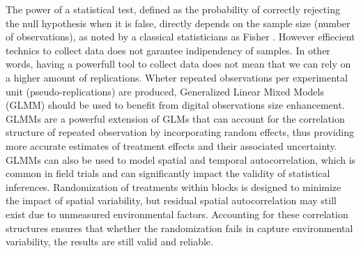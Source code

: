 \documentclass[12pt,a4paper,oneside]{report}
\begin{document}
The power of a statistical test, defined as the probability of correctly
rejecting the null hypothesis when it is false, directly depends on the sample
size (number of observations), as noted by a classical statisticians as
Fisher \cite{fisher_statistical_1992}. However effiecient technics
to collect data does not garantee indipendency of samples. 
In other words, having a powerfull tool to collect data does not mean that we
can rely on a higher amount of replications.
Wheter repeated observations
per experimental unit (pseudo-replications) are produced, Generalized Linear Mixed Models 
(GLMM) \cite{gbur_analysis_2020,kumle_estimating_2021}
should be used to benefit from 
digital observations size enhancement. GLMMs are a powerful extension of GLMs that can
account for the correlation structure of repeated observation
by incorporating random effects, thus providing more
accurate estimates of treatment effects and their associated uncertainty.
GLMMs can also be used to model spatial and temporal autocorrelation, which is
common in field trials and can significantly impact the validity of statistical
inferences. Randomization of treatments within blocks is designed to minimize
the impact of spatial variability, but residual spatial autocorrelation may still
exist due to unmeasured environmental factors. Accounting for these correlation
structures ensures that whether the randomization fails in capture environmental
variability, the results are still valid and reliable.
\end{document}
